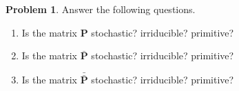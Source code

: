 \documentclass[10pt]{article}
\theoremstyle{definition}
\newtheorem{problem}{Problem}
\newcommand{\p}{\mathbf P}
\newcommand{\pb}{\bar {\p}}
\newcommand{\pbb}{\bar {\pb}}
\begin{document}
\begin{problem}
    Answer the following questions.
    \begin{enumerate}
        \item 
            Is the matrix $\p$ stochastic? irriducible? primitive?
            \vspace{2in}
        \item 
            Is the matrix $\pb$ stochastic? irriducible? primitive?
            \vspace{2in}
        \item 
            Is the matrix $\pbb$ stochastic? irriducible? primitive?
            \vspace{2in}
    \end{enumerate}
\end{problem}
\end{document}
